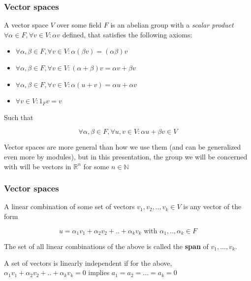 \documentclass{beamer}
\begin{document}
\begin{frame}
\frametitle{Vector spaces}

A vector space $V$ over some field $F$ is an abelian group with a \textit{scalar product} $\forall \alpha \in F, \forall v \in V: \alpha v$ defined, that satisfies the following axioms:

\begin{itemize}
\item $\forall \alpha, \beta \in F,\forall v\in V : \alpha (\beta v) = (\alpha \beta) v$
\item $\forall \alpha, \beta \in F,\forall v\in V : (\alpha + \beta) v = \alpha v + \beta v$
\item $\forall \alpha, \beta \in F,\forall v\in V : \alpha (u+v) = \alpha u + \alpha v$		
\item $\forall v \in V : 1_{F}v = v$		
\end{itemize}

Such that 

\[ \forall \alpha, \beta \in F, \forall u, v \in V : \alpha u + \beta v \in V \]

Vector spaces are more general than how we use them (and can be generalized even more by modules), but in this presentation, the group we will be concerned with will be vectors in $\mathbb{R}^n$ for some $n \in \mathbb{N}$

\end{frame}

\begin{frame}
\frametitle{Vector spaces}
A linear combination of some set of vectors $v_1, v_2,..,v_k \in V$ is any vector of the form

\[ u = \alpha_1 v_1 + \alpha_2 v_2 + .. + \alpha_k v_k \text{ with } \alpha_1,..,\alpha_k \in F\]

The set of all linear combinations of the above is called the \textbf{span} of $v_1, ..., v_k$.	

A set of vectors is linearly independent if for the above, $ \alpha_1 v_1 + \alpha_2 v_2 + .. + \alpha_k v_k = 0$ implies $a_1 = a_2 = ... = a_k = 0$
\end{frame}
\end{document}
